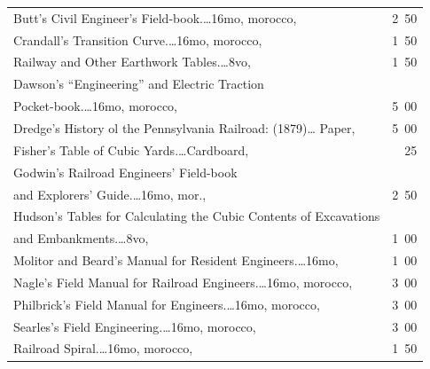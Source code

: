 \documentclass[a4paper,12pt]{book}[2004/02/16]
\theoremstyle{ilemma}
\theoremstyle{itheorem}
\theoremstyle{iother}
\theoremstyle{icorollary}
\theoremstyle{numcorollary}
\theoremstyle{idefinition}
\begin{document}
\begin{longtable}{@{}l@{ }r@{}}
Butt's Civil Engineer's Field-book.\dotfill\ldots 16mo, morocco, &2\ 50\\

Crandall's Transition Curve.\dotfill\ldots 16mo, morocco, &1\ 50\\

\nopagebreak

\indent Railway and Other Earthwork Tables.\dotfill\ldots 8vo, &1\ 50\\

Dawson's ``Engineering'' and Electric Traction\\

\nopagebreak

\indent\indent Pocket-book.\dotfill\ldots 16mo, morocco, &5\ 00\\

Dredge's History ol the Pennsylvania Railroad: (1879)\dotfill\ldots
Paper, &5\ 00\\

Fisher's Table of Cubic Yards.\dotfill\ldots Cardboard, &\ 25\\

Godwin's Railroad Engineers' Field-book\\

\nopagebreak

\indent\indent and Explorers' Guide.\dotfill\ldots 16mo, mor., &2\ 50\\

Hudson's Tables for Calculating the Cubic Contents of Excavations\\

\nopagebreak

\indent\indent and Embankments.\dotfill\ldots 8vo, &1\ 00\\

Molitor and Beard's Manual for Resident Engineers.\dotfill\ldots 16mo,
&1\ 00\\

Nagle's Field Manual for Railroad Engineers.\dotfill\ldots 16mo,
morocco, &3\ 00\\

Philbrick's Field Manual for Engineers.\dotfill\ldots 16mo, morocco,
&3\ 00\\

Searles's Field Engineering.\dotfill\ldots 16mo, morocco, &3\ 00\\

\nopagebreak

\indent Railroad Spiral.\dotfill\ldots 16mo, morocco, &1\ 50\\


\end{longtable}
\end{document}

